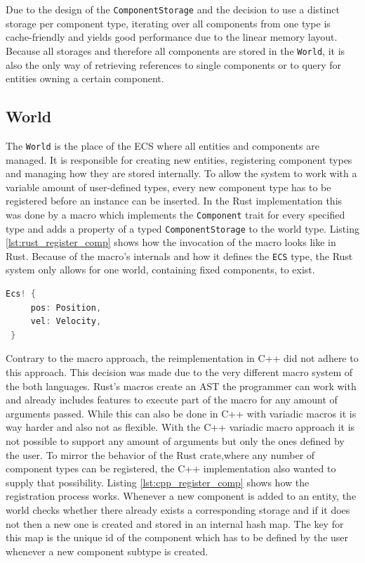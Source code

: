 \noindent
Due to the design of the \texttt{ComponentStorage} and the decision to use a distinct storage per component type, iterating over all components from one type is cache-friendly and yields good performance due to the linear memory layout. Because all storages and therefore all components are stored in the \texttt{World}, it is also the only way of retrieving references to single components or to query for entities owning a certain component. 

\subsection{World}
 
 The \texttt{World} is the place of the \ac{ECS} where all entities and components are managed. It is responsible for creating new entities, registering component types and managing how they are stored internally. To allow the system to work with a variable amount of user-defined types, every new component type has to be registered before an instance can be inserted. In the Rust implementation this was done by a macro which implements the \texttt{Component} trait for every specified type and adds a property of a typed \texttt{ComponentStorage} to the world type. Listing \ref{lst:rust_register_comp} shows how the invocation of the macro looks like in Rust. Because of the macro's internals and how it defines the \texttt{ECS} type, the Rust system only allows for one world, containing fixed components, to exist.\\
 
 \begin{lstlisting}[caption={Registering custom components with the Rust ECS}, label={lst:rust_register_comp}, language={C++}]
 Ecs! {
	 pos: Position,
	 vel: Velocity,
 }
 \end{lstlisting}
 
 \noindent
 Contrary to the macro approach, the reimplementation in C++ did not adhere to this approach. This decision was made due to the very different macro system of the both languages. Rust's macros create an \ac{AST} the programmer can work with and already includes features to execute part of the macro for any amount of arguments passed. While this can also be done in C++ with variadic macros it is way harder and also not as flexible. With the C++ variadic macro approach it is not possible to support any amount of arguments but only the ones defined by the user. To mirror the behavior of the Rust crate,where any number of component types can be registered, the C++ implementation also wanted to supply that possibility. Listing \ref{lst:cpp_register_comp} shows how the registration process works. Whenever a new component is added to an entity, the world checks whether there already exists a corresponding storage and if it does not then a new one is created and stored in an internal hash map. The key for this map is the unique id of the component which has to be defined by the user whenever a new component subtype is created.\\
 
